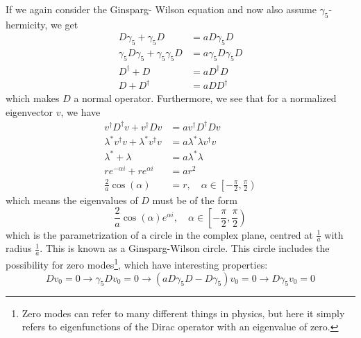 \documentclass[a4paper,10pt]{article}
\begin{document}
If we again consider the Ginsparg- Wilson equation and now also assume $\gamma_5$-hermicity, we get
\begin{equation*}
\begin{aligned} 
D \gamma_{5}+\gamma_{5} D&=a D \gamma_{5} D\\
\gamma_5D\gamma_5 + \gamma_5\gamma_5D &= a \gamma_5D\gamma_5D\\D^\dagger +D &= aD^\dagger D\\D +D^\dagger &= aD D^\dagger
\end{aligned}
\end{equation*}
which makes $D$ a normal operator. Furthermore, we see that for a normalized eigenvector $v$, we have
\begin{equation}
\begin{aligned} 
v^\dagger D^\dagger v +v^\dagger Dv &= av^\dagger D^\dagger D v\\\lambda^*v^\dagger v +\lambda^*v^\dagger v &= a \lambda^*\lambda v^\dagger v\\ \lambda^* + \lambda &= a\lambda^*\lambda\\re^{-\alpha i} +re^{\alpha i} &= ar^2\\\frac{2}{a}\cos(\alpha) &= r,\quad\alpha \in \left[-\frac{\pi}{2}, \frac{\pi}{2} \right)
\end{aligned}
\end{equation}
which means the eigenvalues of $D$ must be of the form
\begin{equation}\label{eq:Ginsparg_wilson_circle}
\frac{2}{a}\cos(\alpha)e^{\alpha i},\quad\alpha \in \left[-\frac{\pi}{2}, \frac{\pi}{2} \right)
\end{equation}
which is the parametrization of a circle in the complex plane, centred at $\frac{1}{a}$ with radius $\frac{1}{a}$. This is known as a Ginsparg-Wilson circle. This circle includes the possibility for zero modes\footnote{Zero modes can refer to many different things in physics, but here it simply refers to eigenfunctions of the Dirac operator with an eigenvalue of zero.}, which have interesting properties:
\begin{equation}
Dv_0 = 0 \rightarrow \gamma_5Dv_0 = 0 \rightarrow \left( aD\gamma_5D - D\gamma_5 \right)v_0 = 0 \rightarrow D\gamma_5v_0 = 0
\end{equation}
\end{document}
